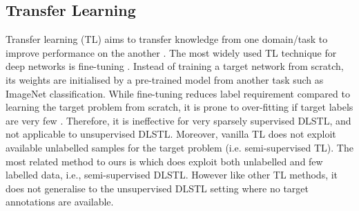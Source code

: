 \documentclass[letterpaper]{article} \usepackage{aaai19}  \usepackage{times}  \usepackage{helvet}  \usepackage{courier}  \usepackage{url}  \usepackage{graphicx}
\begin{document}
\begin{comment}
\begin{table}[h]
\begin{tabular}{lll}
                          & Aligned Label Space     & Disjoint Label Space (DLS)    \\
Unlabelled Target         & UDA                     & U-DLS-TL                      \\
Partially Labelled Target & Semi-TL                 & Semi-DLS-TL                   \\
Fully Labelled Target     & Supervised DA/Fine-tune & Supervised Learning/Fine-tune
\end{tabular}
\end{table}
\end{comment}

\subsection{Transfer Learning}
Transfer learning (TL) aims to transfer knowledge from one domain/task to improve performance on the another \cite{pan2010survey}. The most widely used TL technique for deep networks is fine-tuning \cite{yosinski2014transferable,chen2018lstd,ren2015faster}. Instead of training a target network from scratch, its weights are initialised by a pre-trained model from another  task such as ImageNet \cite{deng2009imagenet} classification. 
While fine-tuning reduces label requirement compared to learning the target problem from scratch, it is prone to over-fitting if target labels are very few  \cite{yosinski2014transferable}. Therefore, it is ineffective for very sparsely supervised DLSTL, and not applicable to unsupervised DLSTL. 
Moreover, vanilla TL does not exploit available unlabelled samples for the target problem (i.e. semi-supervised TL). The most related method to ours is \cite{label_eff_open_da_2017} which does exploit both unlabelled and few labelled data, i.e., semi-supervised DLSTL. However like other TL methods, it does not generalise to the unsupervised DLSTL setting where no target annotations are available.
\end{document}
